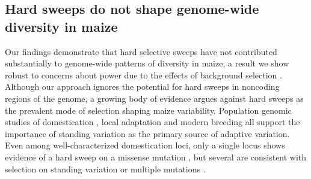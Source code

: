 \documentclass{pnastwo}
\begin{document}
\begin{article}


\subsection{Hard sweeps do not shape genome-wide diversity in maize}

Our findings demonstrate that hard selective sweeps have not contributed substantially to genome-wide patterns of diversity in maize, a result we show robust to concerns about power due to the effects of background selection  \cite{enard2014}. 
Although our approach ignores the potential for hard sweeps in noncoding regions of the genome, a growing body of evidence argues against hard sweeps as the prevalent mode of selection shaping maize variability. 
Population genomic studies of domestication \cite{hufford2012},  local adaptation \cite{Takuno15062015} and modern breeding \cite{beissinger2014} all support the importance of standing variation as the primary source of adaptive variation. 
Even among well-characterized domestication loci, only a single locus shows evidence of a hard sweep on a missense mutation \cite{wang2015}, but several are consistent with selection on standing variation \cite{studer2011,gallavotti2004role} or multiple mutations \cite{wills2013}.


\end{article}
\end{document}
